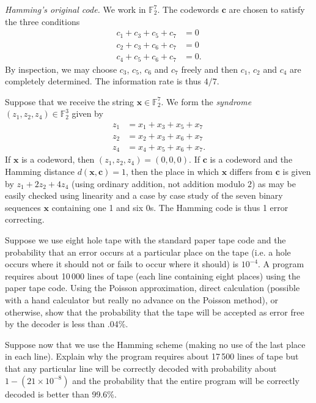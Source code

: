 \noindent\emph{Hamming's original code.}
We work in ${\mathbb F}_{2}^{7}$. The codewords
${\mathbf c}$ are chosen to satisfy the
three conditions
\begin{align*}
c_{1}+c_{3}+c_{5}+c_{7}&=0\\
c_{2}+c_{3}+c_{6}+c_{7}&=0\\
c_{4}+c_{5}+c_{6}+c_{7}&=0.
\end{align*}
By inspection, we may choose $c_{3}$, $c_{5}$, $c_{6}$
and $c_{7}$ freely and then $c_{1}$, $c_{2}$ and $c_{4}$
are completely determined. The information rate is
thus $4/7$.

Suppose that we receive the string
${\mathbf x}\in{\mathbb F}_{2}^{7}$.
We form the \emph{syndrome}
$(z_{1},z_{2},z_{4})\in{\mathbb F}_{2}^{3}$
given by
\begin{align*}
z_{1}&=x_{1}+x_{3}+x_{5}+x_{7}\\
z_{2}&=x_{2}+x_{3}+x_{6}+x_{7}\\
z_{4}&=x_{4}+x_{5}+x_{6}+x_{7}.
\end{align*}
If ${\mathbf x}$ is a codeword, then
$(z_{1},z_{2},z_{4})=(0,0,0)$.
If ${\mathbf c}$ is a codeword and
the Hamming distance $d({\mathbf x},{\mathbf c})=1$,
then the place in which ${\mathbf x}$ differs
from ${\mathbf c}$ is given by $z_{1}+2z_{2}+4z_{4}$
(using ordinary addition, not addition modulo $2$)
as may be easily checked using linearity
and a case by case study of the seven binary
sequences ${\mathbf x}$ containing one 1
and six 0s. The Hamming code is thus 1
error correcting.

\begin{exercise}\label{bacon}
Suppose we use eight hole tape with
the standard paper tape code
and the probability that an error occurs at a particular
place on the tape (i.e. a hole occurs where it should
not or fails to occur where it should) is $10^{-4}$.
A program requires about 10\,000 lines of tape
(each line containing eight places)
using the paper tape code. Using
the Poisson approximation, direct calculation
(possible with a hand calculator but really no
advance on the Poisson method), or otherwise,
show that the probability that the tape
will be accepted as error free by the decoder
is less than .04\%.

Suppose now that we use the Hamming scheme
(making no use of the last place in each line).
Explain why the program requires about
17\,500 lines of tape but that any
particular line will be correctly decoded
with probability about $1-(21\times 10^{-8})$
and the probability that the entire program
will be correctly decoded is better than
99.6\%.
\end{exercise}

